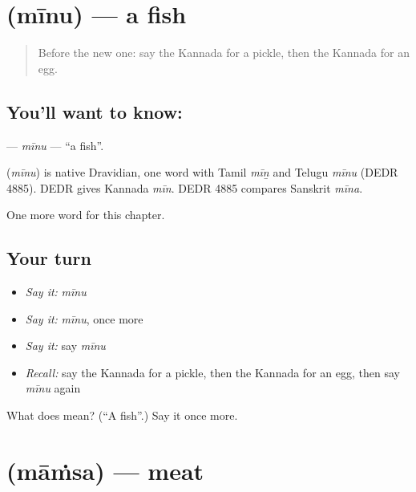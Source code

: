 \section[\texorpdfstring{\kn{ಮೀನು} (mīnu)}{ಮೀನು (mīnu)}]{ (mīnu) — a fish}

\label{lesson:KA-C122-minu}



\begin{quote}
Before the new one: say the Kannada for a pickle, then the Kannada for an egg.
\end{quote}

\subsection*{You'll want to know: }
\textbf{} — \emph{mīnu} — \textquotedblleft{}a fish\textquotedblright{}.

\begin{cousinweb}
\textbf{} (\emph{mīnu}) is native Dravidian, one word with Tamil \emph{mīṉ} and Telugu \emph{mīnu} (DEDR 4885). DEDR gives Kannada \emph{mīn}. DEDR 4885 compares Sanskrit \emph{mīna}.
\end{cousinweb}

\begin{grammarlens}[title={What you've built}]
One more word for this chapter.
\end{grammarlens}

\subsection*{Your turn}
\begin{itemize}
\raggedright
  \item \emph{Say it:} \emph{mīnu}
  \item \emph{Say it:} \emph{mīnu}, once more
  \item \emph{Say it:} say \emph{mīnu}
  \item \emph{Recall:} say the Kannada for a pickle, then the Kannada for an egg, then say \emph{mīnu} again
\end{itemize}

\begin{tcolorbox}[breakable,colback=teal!4,colframe=teal!35!black,title={Before you move on}]
What does  mean? (\textquotedblleft{}A fish\textquotedblright{}.) Say it once more.
\end{tcolorbox}
\section[\texorpdfstring{\kn{ಮಾಂಸ} (māṁsa)}{ಮಾಂಸ (māṁsa)}]{ (māṁsa) — meat}

